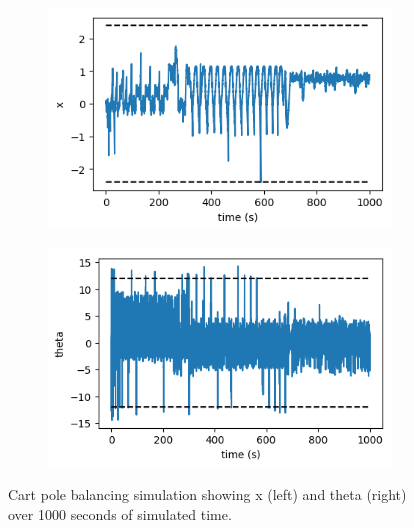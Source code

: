\documentclass{article}
\begin{document}
\begin{figure}[h]
	\centering
	\begin{subfigure}[t]{0.28\linewidth}
		\centering
		\includegraphics[width = 1.0\linewidth, trim={0 0 0 0}, clip=true]{figures/learn50000_xs.png}
	\end{subfigure}%
	\hspace{0.1\linewidth}
	\begin{subfigure}[t]{0.28\linewidth}
		\centering
		\includegraphics[width = 1.0\linewidth, trim={0 0 0 0}, clip=true]{figures/learn50000_thetas.png}
	\end{subfigure}%
\caption{Cart pole balancing simulation showing x (left) and theta (right) over 1000 seconds of simulated time.}
\label{fig:balance_example}
\end{figure}
\end{document}
